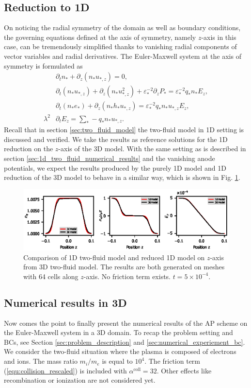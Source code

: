 \documentclass{report}
\begin{document}
\subsection{Reduction to 1D}
On noticing the radial symmetry of the domain as well as boundary conditions, the governing equations defined at the axis of symmetry, namely $z$-axis in this case, can be tremendously simplified thanks to vanishing radial components of vector variables and radial derivatives. The Euler-Maxwell system at the axis of symmetry is formulated as 
\begin{align}
    &\partial_t n_* + \partial_z(n_*u_{*,z}) = 0, \\
    &\partial_t (n_* u_{*,z}) + \partial_z(n_*u_{*,z}^2) + \varepsilon_*^{-2} \partial_z P_* = \varepsilon_*^{-2}q_*n_*E_z, \\
    &\partial_t (n_*e_*) + \partial_z (n_* h_* u_{*,z}) = \varepsilon_*^{-2} q_* n_* u_{*,z} E_z, \\
    \lambda^2 &\partial_t E_z = \sum_* - q_* n_* u_{*,z}.
\end{align}
Recall that in section \ref{sec:two_fluid_model} the two-fluid model in 1D setting is discussed and verified. We take the results as reference solutions for the 1D reduction on the $z$-axis of the 3D model. With the same setting as is described in section \ref{sec:1d_two_fluid_numerical_results} and the vanishing anode potentials, we expect the results produced by the purely 1D model and 1D reduction of the 3D model to behave in a similar way, which is shown in Fig. \ref{fig:z_axis_reduction}.
\begin{figure}
    \centering
    \includegraphics{z_axis_reduction.eps}
    \caption{Comparison of 1D two-fluid model and reduced 1D model on $z$-axis from 3D two-fluid model. The results are both generated on meshes with 64 cells along $z$-axis. No friction term exists. $t = 5 \times 10^{-4}.$}
    \label{fig:z_axis_reduction}
\end{figure}

\subsection{Numerical results in 3D} \label{chap:3d_problem}
Now comes the point to finally present the numerical results of the AP scheme on the Euler-Maxwell system in a 3D domain. To recap the problem setting and BCs, see Section \ref{sec:problem_description} and \ref{sec:numerical_experiement_bc}. We consider the two-fluid situation where the plasma is composed of electrons and ions. The mass ratio $m_i / m_e$ is equal to $10^4$. The friction term (\ref{equ:collision_rescaled}) is included with $\alpha^\text{coll} = 32$. Other effects like recombination or ionization are not considered yet.  
\end{document}
